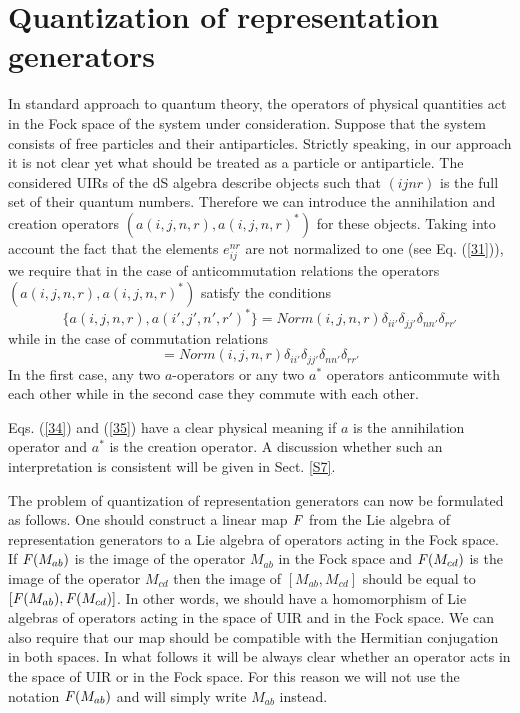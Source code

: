 \documentclass[a4paper,12pt]{article}%
\begin{document}
\section{Quantization of representation generators}
\label{S5}
 
In standard approach to quantum theory, the operators of 
physical quantities act in the Fock space of the system under 
consideration. Suppose that the system consists
of free particles and their antiparticles.
Strictly speaking, in our approach it is not clear yet
what should be treated as a particle or antiparticle.
The considered UIRs of the dS algebra describe objects
such that $(ijnr)$ is the full set of
their quantum numbers. Therefore we can introduce the
annihilation and creation operators 
$(a(i,j,n,r),a(i,j,n,r)^*)$ for these objects. 
Taking into account the fact that the elements $e^{nr}_{ij}$
are not normalized to one (see Eq. (\ref{31})), we require
that in the case of anticommutation relations the 
operators $(a(i,j,n,r),a(i,j,n,r)^*)$ satisfy the conditions
\begin{equation}
\{a(i,j,n,r),a(i',j',n',r')^*\}=Norm(i,j,n,r)
\delta_{ii'}\delta_{jj'}\delta_{nn'}\delta_{rr'}
\label{34}
\end{equation}
while in the case of commutation relations
\begin{equation}
[a(i,j,n,r),a(i',j',n',r')^*]=Norm(i,j,n,r)
\delta_{ii'}\delta_{jj'}\delta_{nn'}\delta_{rr'}
\label{35}
\end{equation}
In the first case, any two $a$-operators or any two
$a^*$ operators anticommute with each other while
in the second case they commute with each other.

Eqs. (\ref{34}) and (\ref{35}) have a clear physical
meaning if $a$ is the annihilation operator and $a^*$
is the creation operator. A discussion whether
such an interpretation is consistent will be
given in Sect. \ref{S7}.

The problem of quantization of representation 
generators can now be formulated as follows. 
One should construct a linear map ${\it F}$ from 
the Lie algebra of representation generators to a 
Lie algebra of operators acting in the Fock space. 
If ${\it F}(M_{ab})$ is the image of the operator
$M_{ab}$ in the Fock space and ${\it F}(M_{cd})$ 
is the image of the operator $M_{cd}$ then the
image of $[M_{ab},M_{cd}]$ should be equal to  
$[{\it F}(M_{ab}),{\it F}(M_{cd})]$.
In other words, we should have a homomorphism
of Lie algebras of operators acting in the space of UIR
and in the Fock space. We can also require that our 
map should be compatible with the Hermitian
conjugation in both spaces. In what follows it will
be always clear whether an operator acts in the
space of UIR or in the Fock space. For this reason
we will not use the notation ${\it F}(M_{ab})$
and will simply write $M_{ab}$ instead.
\end{document}
